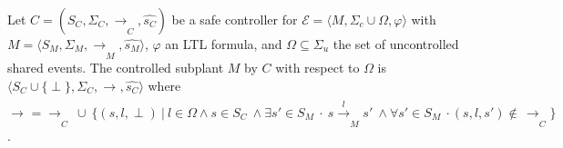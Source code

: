\begin{definition} \label{partial-synthesis}
Let $C= (S_C, \Sigma_C, \xrightarrow[]{}_{C},\hat{ {s_C}})$ be a safe controller for  $\mathcal{E} = \langle M, \Sigma_c \cup \Omega, \varphi \rangle$ %
with $M = \langle S_M, \Sigma_M, \xrightarrow[]{}_M, \hat{s_M} \rangle$, $\varphi$ an LTL formula, and $\Omega \subseteq \Sigma_u$ the set of uncontrolled shared events. 
The controlled subplant $M$ by $C$ with respect to $\Omega$ is
     $   \langle S_C \cup \{ \perp \}, \Sigma_C, \xrightarrow[]{}_{}, \hat{s_{C}}  \rangle$
  where $\xrightarrow[]{}_{} = \xrightarrow[]{}_{C} \ \cup \ \{ (s, l, \perp) \ | \ l \in \Omega \wedge s \in S_C \ 
    \wedge \exists s' \in S_M \ \cdot \ s \xrightarrow[]{l}_M s' \ \wedge \forall s' \in S_M \ \cdot (s,l,s') \notin \,
    \xrightarrow[]{}_{C} \}$. 
\end{definition}





